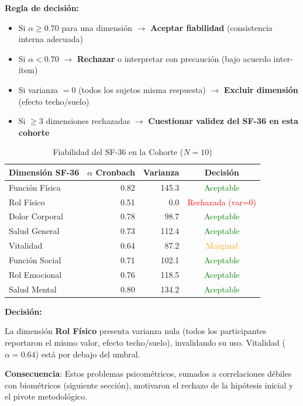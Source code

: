 \documentclass[12pt,letterpaper,twoside]{report}
\begin{document}
\begin{reglabox}
\textbf{Regla de decisión:}

\begin{itemize}[noitemsep]
    \item Si $\alpha \geq 0.70$ para una dimensión $\to$ \textbf{Aceptar fiabilidad} (consistencia interna adecuada)
    \item Si $\alpha < 0.70$ $\to$ \textbf{Rechazar} o interpretar con precaución (bajo acuerdo inter-ítem)
    \item Si varianza $= 0$ (todos los sujetos misma respuesta) $\to$ \textbf{Excluir dimensión} (efecto techo/suelo)
    \item Si $\geq 3$ dimensiones rechazadas $\to$ \textbf{Cuestionar validez del SF-36 en esta cohorte}
\end{itemize}
\end{reglabox}

\begin{table}[H]
\centering
\caption{Fiabilidad del SF-36 en la Cohorte ($N=10$)}
\label{tab:sf36_reliability}
\begin{tabular}{@{}lrrc@{}}
\toprule
\textbf{Dimensión SF-36} & \textbf{$\alpha$ Cronbach} & \textbf{Varianza} & \textbf{Decisión} \\
\midrule
Función Física    & 0.82 & 145.3 & \textcolor{green}{Aceptable} \\
Rol Físico        & 0.51 & 0.0   & \textcolor{red}{Rechazada (var=0)} \\
Dolor Corporal    & 0.78 & 98.7  & \textcolor{green}{Aceptable} \\
Salud General     & 0.73 & 112.4 & \textcolor{green}{Aceptable} \\
Vitalidad         & 0.64 & 87.2  & \textcolor{orange}{Marginal} \\
Función Social    & 0.71 & 102.1 & \textcolor{green}{Aceptable} \\
Rol Emocional     & 0.76 & 118.5 & \textcolor{green}{Aceptable} \\
Salud Mental      & 0.80 & 134.2 & \textcolor{green}{Aceptable} \\
\bottomrule
\end{tabular}
\end{table}

\begin{decisionbox}
\textbf{Decisión:}

La dimensión \textbf{Rol Físico} presenta varianza nula (todos los participantes reportaron el mismo valor, efecto techo/suelo), invalidando su uso. Vitalidad ($\alpha=0.64$) está por debajo del umbral.

\textbf{Consecuencia}: Estos problemas psicométricos, sumados a correlaciones débiles con biométricos (siguiente sección), motivaron el rechazo de la hipótesis inicial y el pivote metodológico.
\end{decisionbox}
\end{document}
